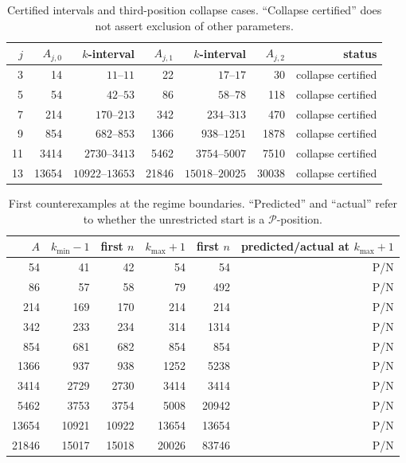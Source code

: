 \documentclass[11pt]{article}
\theoremstyle{remark}
\newcommand{\Pset}{\mathcal{P}}
\begin{document}
\begin{table}[h]
\centering
\caption{Certified intervals and third-position collapse cases. ``Collapse certified'' does not assert exclusion of other parameters.}\label{tab:Chierarchy}
\begin{tabular}{rrrrrrr}
\toprule
$j$ & $A_{j,0}$ & $k$-interval & $A_{j,1}$ & $k$-interval & $A_{j,2}$ & status\\
\midrule
3 & 14 & $11$--$11$ & 22 & $17$--$17$ & 30 & collapse certified\\
5 & 54 & $42$--$53$ & 86 & $58$--$78$ & 118 & collapse certified\\
7 & 214 & $170$--$213$ & 342 & $234$--$313$ & 470 & collapse certified\\
9 & 854 & $682$--$853$ & 1366 & $938$--$1251$ & 1878 & collapse certified\\
11 & 3414 & $2730$--$3413$ & 5462 & $3754$--$5007$ & 7510 & collapse certified\\
13 & 13654 & $10922$--$13653$ & 21846 & $15018$--$20025$ & 30038 & collapse certified\\
\bottomrule
\end{tabular}
\end{table}

\begin{table}[h]
\centering
\caption{First counterexamples at the regime boundaries. ``Predicted'' and ``actual'' refer to whether the unrestricted start is a $\Pset$-position.}\label{tab:Cboundary}
\begin{tabular}{rrrrrr}
\toprule
$A$ & $k_{\min}-1$ & first $n$ & $k_{\max}+1$ & first $n$ & predicted/actual at $k_{\max}+1$\\
\midrule
54 & 41 & 42 & 54 & 54 & P/N\\
86 & 57 & 58 & 79 & 492 & P/N\\
214 & 169 & 170 & 214 & 214 & P/N\\
342 & 233 & 234 & 314 & 1314 & P/N\\
854 & 681 & 682 & 854 & 854 & P/N\\
1366 & 937 & 938 & 1252 & 5238 & P/N\\
3414 & 2729 & 2730 & 3414 & 3414 & P/N\\
5462 & 3753 & 3754 & 5008 & 20942 & P/N\\
13654 & 10921 & 10922 & 13654 & 13654 & P/N\\
21846 & 15017 & 15018 & 20026 & 83746 & P/N\\
\bottomrule
\end{tabular}
\end{table}
\end{document}
